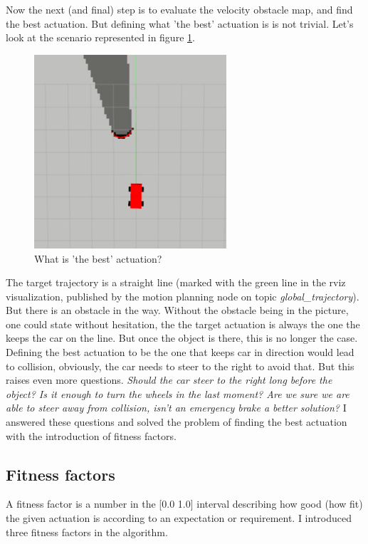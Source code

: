 Now the next (and final) step is to evaluate the velocity obstacle map, and find the best actuation. But defining what 'the best' actuation is is not trivial.
Let's look at the scenario represented in figure \ref{what_is_the_best_actuation}.

\begin{figure}[!ht]
    \centering
    \includegraphics[height=72mm]{figures/raw/rviz_straight_traj_static_object.png}
    \caption{What is 'the best' actuation?}
    \label{what_is_the_best_actuation}
\end{figure}

The target trajectory is a straight line (marked with the green line in the rviz visualization, published by the motion planning node on topic \textit{global\_trajectory}). But there is an obstacle in the way. Without the obstacle being in the picture, one could state without hesitation, the the target actuation is always the one the keeps the car on the line. But once the object is there, this is no longer the case. Defining the best actuation to be the one that keeps car in direction would lead to collision, obviously, the car needs to steer to the right to avoid that. But this raises even more questions. \textit{Should the car steer to the right long before the object? Is it enough to turn the wheels in the last moment? Are we sure we are able to steer away from collision, isn't an emergency brake a better solution?} I answered these questions and solved the problem of finding the best actuation with the introduction of fitness factors.

\subsection{Fitness factors}
A fitness factor is a number in the [0.0 1.0] interval describing how good (how fit) the given actuation is according to an expectation or requirement. I introduced three fitness factors in the algorithm.

